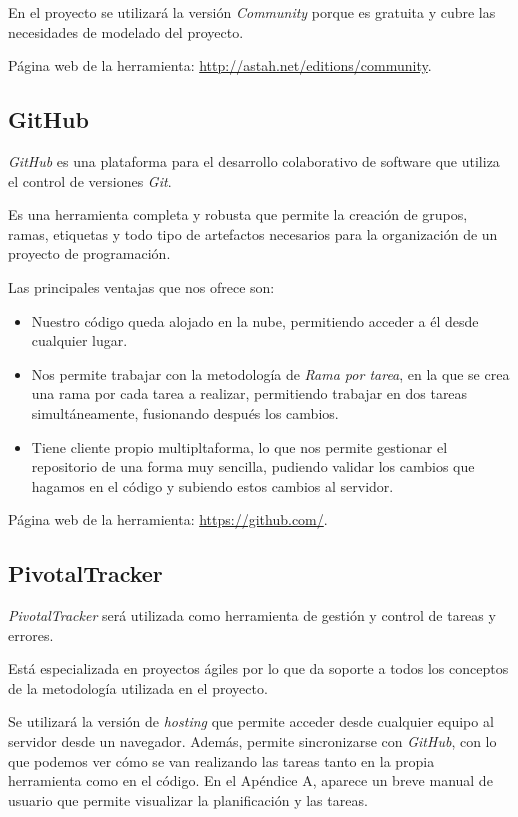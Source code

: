 En el proyecto se utilizará la versión \textit{Community} porque es gratuita y cubre las necesidades de modelado del proyecto.

Página web de la herramienta: \url{http://astah.net/editions/community}.


\subsection{GitHub}
\textit{GitHub} es una plataforma para el desarrollo colaborativo de software que utiliza el control de versiones \textit{Git}.

Es una herramienta completa y robusta que permite la creación de grupos, ramas, etiquetas y todo tipo de artefactos necesarios para la organización de un proyecto de programación.

Las principales ventajas que nos ofrece son:
\begin{itemize}
\item Nuestro código queda alojado en la nube, permitiendo acceder a él desde cualquier lugar.
\item Nos permite trabajar con la metodología de \textit{Rama por tarea}, en la que se crea una rama por cada tarea a realizar, permitiendo trabajar en dos tareas simultáneamente, fusionando después los cambios.
\item Tiene cliente propio multipltaforma, lo que nos permite gestionar el repositorio de una forma muy sencilla, pudiendo validar los cambios que hagamos en el código y subiendo estos cambios al servidor.
\end{itemize}

Página web de la herramienta: \url{https://github.com/}.


\subsection{PivotalTracker}
\textit{PivotalTracker} será utilizada como herramienta de gestión y control de tareas y errores.

Está especializada en proyectos ágiles por lo que da soporte a todos los conceptos de la metodología \scrum{} utilizada en el proyecto.

Se utilizará la versión de \textit{hosting} que permite acceder desde cualquier equipo al servidor desde un navegador. Además, permite sincronizarse con \textit{GitHub}, con lo que podemos ver cómo se van realizando las tareas tanto en la propia herramienta como en el código. En el Apéndice A, aparece un breve manual de usuario que permite visualizar la planificación y las tareas.


